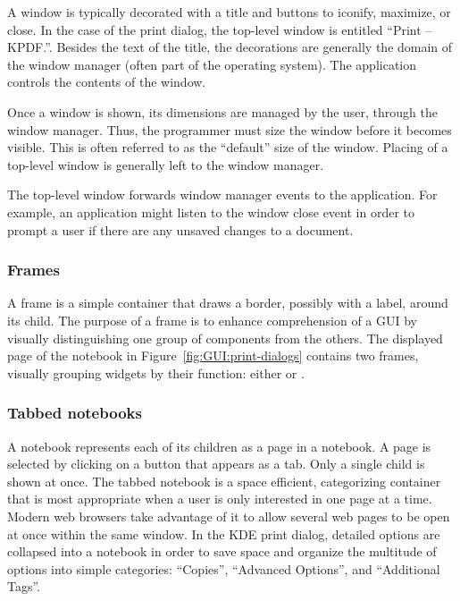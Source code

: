 A window is typically decorated with a title and buttons to iconify,
maximize, or close. In the case of the print dialog, the top-level
window is entitled ``Print -- KPDF.''. Besides the text of the title,
the decorations are generally the domain of the window manager (often
part of the operating system). The application controls the contents
of the window.

Once a window is shown, its dimensions are managed by the user,
through the window manager. Thus, the programmer must size the window
before it becomes visible. This is often referred to as the
``default'' size of the window. Placing of a top-level window is
generally left to the window manager.

The top-level window forwards window manager events to the
application. For example, an application might listen to the window
close event in order to prompt a user if there are any unsaved changes
to a document.


\subsubsection{Frames}
\label{sec:GUI:frames}

A frame is a simple container that draws a border, possibly with a
label, around its child. The purpose of a frame is to enhance
comprehension of a GUI by visually distinguishing one group of
components from the others. The displayed page of the notebook in
Figure~\ref{fig:GUI:print-dialogs} contains two frames, visually
grouping widgets by their function: either 
or .

\subsubsection{Tabbed notebooks}
\label{sec:GUI:notebooks}

A notebook represents each of its children as a page in a notebook. A
page is selected by clicking on a button that appears as a tab. Only a
single child is shown at once. The tabbed notebook is a space
efficient, categorizing container that is most appropriate when a user
is only interested in one page at a time. Modern web browsers take
advantage of it to allow several web pages to be open at once within
the same window. In the KDE print dialog, detailed options are
collapsed into a notebook in order to save space and organize the
multitude of options into simple categories: ``Copies'', ``Advanced
Options'', and ``Additional Tags''.

